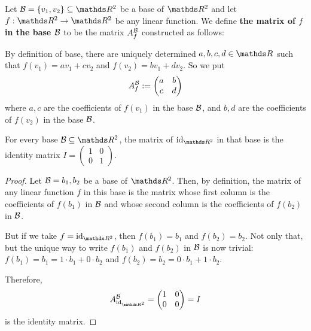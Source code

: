 \begin{df}
	Let $\mc B=\{v_1,v_2\}\subseteq \R^2$ be a base of $\R^2$ and let $f:\R^2\to\R^2$ be any linear function. We define \textbf{the matrix of $f$ in the base $\mathcal B$} to be the matrix $A_f^{\mathcal B}$ constructed as follows:
	
	By definition of base, there are uniquely determined $a,b,c,d\in \R$ such that $f(v_1)=av_1+cv_2$ and $f(v_2)=bv_1+dv_2$. So we put
	\[A_f^{\mathcal B}:=\begin{pmatrix}
	a&b\\c&d
	\end{pmatrix}\]where $a,c$ are the coefficients of $f(v_1)$ in the base $\mathcal B$, and $b,d$ are the coefficients of $f(v_2)$ in the base $\mathcal B$.
\end{df}

\begin{lemma}
	For every base $\mc B\subseteq \R^2$, the matrix of $\id_{\R^2}$ in that base is the identity matrix $I=\begin{pmatrix}
	1&0\\0&1
	\end{pmatrix}$.
\end{lemma}

\begin{proof}
	Let $\mathcal B={b_1,b_2}$ be a base of $\R^2$. Then, by definition, the matrix of any linear function $f$ in this base is the matrix whose first column is the coefficients of $f(b_1)$ in $\mathcal B$ and whose second column is the coefficients of $f(b_2)$ in $\mathcal B$.
	
	But if we take $f=\id_{\R^2}$, then $f(b_1)=b_1$ and $f(b_2)=b_2$. Not only that, but the unique way to write $f(b_1)$ and $f(b_2)$ in $\mathcal B$ is now trivial: $f(b_1)=b_1=1\cdot b_1+0\cdot b_2$ and $f(b_2)=b_2=0\cdot b_1+1\cdot b_2$.
	
	Therefore, 
	\[A_{\id_{\R^2}}^{\mc B}=\begin{pmatrix}
		1&0\\0&0
		\end{pmatrix}=I\]is the identity matrix.
\end{proof}

